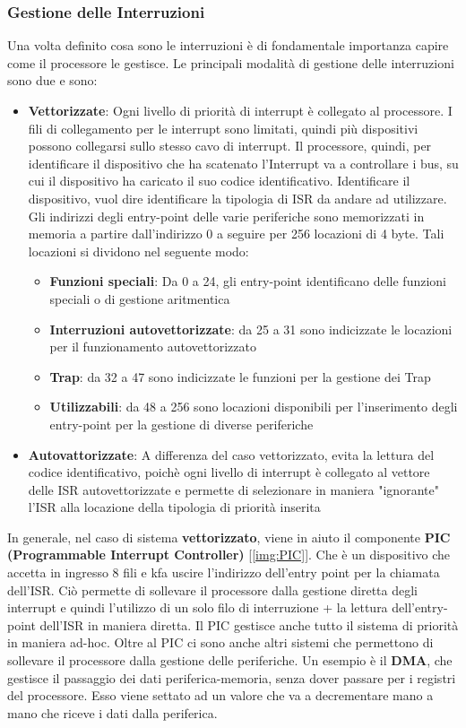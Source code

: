 \subsubsection{Gestione delle Interruzioni}
Una volta definito cosa sono le interruzioni è di fondamentale importanza capire come il processore le gestisce. Le principali modalità di gestione delle interruzioni sono due e sono:
\begin{itemize}
    \item \textbf{Vettorizzate}: Ogni livello di priorità di interrupt è collegato al processore. I fili di collegamento per le interrupt sono limitati, quindi più dispositivi possono collegarsi sullo stesso cavo di interrupt. Il processore, quindi, per identificare il dispositivo che ha scatenato l'Interrupt va a controllare i bus, su cui il dispositivo ha caricato il suo codice identificativo. Identificare il dispositivo, vuol dire identificare la tipologia di ISR da andare ad utilizzare. Gli indirizzi degli entry-point delle varie periferiche sono memorizzati in memoria a partire dall'indirizzo 0 a seguire per 256 locazioni di 4 byte. Tali locazioni si dividono nel seguente modo:
    \begin{itemize}
        \item \textbf{Funzioni speciali}: Da 0 a 24, gli entry-point identificano delle funzioni speciali o di gestione aritmentica
        \item \textbf{Interruzioni autovettorizzate}: da 25 a 31 sono indicizzate le locazioni per il funzionamento autovettorizzato
        \item \textbf{Trap}: da 32 a 47 sono indicizzate le funzioni per la gestione dei Trap
        \item \textbf{Utilizzabili}: da 48 a 256 sono locazioni disponibili per l'inserimento degli entry-point per la gestione di diverse periferiche
    \end{itemize}
    \item \textbf{Autovattorizzate}: A differenza del caso vettorizzato, evita la lettura del codice identificativo, poichè ogni livello di interrupt è collegato al vettore delle ISR autovettorizzate e permette di selezionare in maniera "ignorante" l'ISR alla locazione della tipologia di priorità inserita
\end{itemize}

In generale, nel caso di sistema \textbf{vettorizzato}, viene in aiuto il componente \textbf{PIC (Programmable Interrupt Controller)} [\ref{img:PIC}]. Che è un dispositivo che accetta in ingresso 8 fili e kfa uscire l'indirizzo dell'entry point per la chiamata dell'ISR. Ciò permette di sollevare il processore dalla gestione diretta degli interrupt e quindi l'utilizzo di un solo filo di interruzione + la lettura dell'entry-point dell'ISR in maniera diretta. Il PIC gestisce anche tutto il sistema di priorità in maniera ad-hoc.
Oltre al PIC ci sono anche altri sistemi che permettono di sollevare il processore dalla gestione delle periferiche. Un esempio è il \textbf{DMA}, che gestisce il passaggio dei dati periferica-memoria, senza dover passare per i registri del processore. Esso viene settato ad un valore che va a decrementare mano a mano che riceve i dati dalla periferica.

